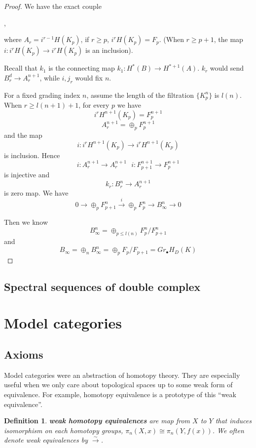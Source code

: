 \documentclass[11pt]{article}
\newtheorem{dfn}[thm]{Definition}
\newcommand{\lrta}{\longrightarrow}
\begin{document}
\begin{proof}
We have the exact couple
\begin{center}
,
\end{center}
where $A_r=i^{r-1}H(K_p)$, if $r\geq p$, $i^rH(K_p)=F_p$. (When $r\geq p+1$, the map $i:i^rH(K_p)\lrta i^rH(K_p)$ is an inclusion).

Recall that $k_1$ is the connecting map $k_1:H^{*}(B)\lrta H^{*+1}(A)$. $k_r$ would send $B_r^d\lrta A_r^{n+1}$, while $i,j_r$ would fix $n$.

For a fixed grading index $n$, assume the length of the filtration $\{K_p^n\}$ is $l(n)$. When $r\geq l(n+1)+1$, for every $p$ we have
$$
i^rH^{n+1}(K_p)=F_p^{n+1}
$$
$$
A_r^{n+1}=\oplus_p F_p^{n+1}
$$
and the map
$$
i: i^rH^{n+1}(K_p)\lrta i^rH^{n+1}(K_p)
$$
is inclusion. Hence 
$$
i:A_r^{n+1}\lrta A_r^{n+1}\ \ \ i:F_{p+1}^{n+1}\lrta F_{p}^{n+1}
$$
is injective and 
$$
k_r:B_r^{n}\lrta A_r^{n+1}
$$
is zero map. We have
$$
0\lrta \oplus_p F_{p+1}^{n}\overset{i}{\lrta} \oplus_p F_{p}^{n}\lrta B_\infty^n\lrta 0 
$$

Then we know
$$
B_\infty^n=\oplus_{p\leq l(n)}F^{n}_p/F^n_{p+1}
$$
and 
$$
B_\infty=\oplus_n B_\infty^n=\oplus_p F_p/F_{p+1}=Gr_\bullet H_D(K)
$$

\end{proof}
\subsection{Spectral sequences of double complex}

\section{Model categories}
\subsection{Axioms}
Model categories were an abstraction of homotopy theory. They are especially useful when we only care about topological spaces up to some weak form of equivalence. For example, homotopy equivalence is a prototype of this ``weak equivalence''.
\begin{dfn}
\textbf{weak homotopy equivalences} are map from $X$ to $Y$ that induces isomorphism on each homotopy groups, $\pi_n(X,x)\cong \pi_n(Y,f(x))$. We often denote weak equivalences by $\overset{\sim}{\lrta}$.
\end{dfn}
\end{document}
